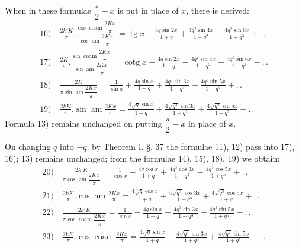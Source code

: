 \documentclass{article}
\begin{document}
When in these formulae $\dfrac{\pi}{2}-x$ is put in place of $x$, there is derived:
\[
\begin{gathered}
\text{16)}\quad\frac{2k'K}{\pi}.\frac{\cos\operatorname{coam}\dfrac{2Kx}{\pi}}{\cos\operatorname{am}\dfrac{2Kx}{\pi}}=\operatorname{tg}x-\frac{4q\sin2x}{1+q}+\frac{4q^{2}\sin4x}{1+q^{2}}-\frac{4q^{3}\sin6x}{1+q^{3}}+.\,.\\[2ex]
\text{17)}\quad\frac{2K}{\pi}.\frac{\sin\operatorname{coam}\dfrac{2Kx}{\pi}}{\sin\operatorname{am}\dfrac{2Kx}{\pi}}=\operatorname{cotg}x+\frac{4q\sin2x}{1-q}-\frac{4q^{2}\sin4x}{1+q^{2}}+\frac{4q^{3}\sin6x}{1-q^{3}}-.\,.\\[2ex]
\text{18)}\quad\frac{2K}{\pi\sin\operatorname{am}\dfrac{2Kx}{\pi}}=\frac{1}{\sin x}+\frac{4q\sin x}{1-q}+\frac{4q^{3}\sin3x}{1-q^{3}}+\frac{4q^{5}\sin5x}{1-q^{5}}+.\,.\\[2ex]
\text{19)}\quad\frac{2kK}{\pi}.\sin\operatorname{am}\frac{2Kx}{\pi}=\frac{4\sqrt{q}\sin x}{1-q}+\frac{4\sqrt{q^{3}}\sin3x}{1-q^{3}}+\frac{4\sqrt{q^{5}}\sin5x}{1-q^{5}}+.\,.
\end{gathered}
\]
Formula 13) remains unchanged on putting $\dfrac{\pi}{2}-x$ in place of $x$.

On changing $q$ into $-q$, by Theorem I. §. 37 the formulae 11), 12) pass into 17), 16); 13) remains unchanged; from the formulae 14), 15), 18), 19) we obtain:
\[
\begin{gathered}
\text{20)}\quad\frac{2k'K}{\pi\cos\operatorname{am}\dfrac{2Kx}{\pi}}=\frac{1}{\cos x}-\frac{4q\cos x}{1+q}+\frac{4q^{3}\cos3x}{1-q^{3}}-\frac{4q^{5}\cos5x}{1+q^{5}}+.\,.\\[2ex]
\text{21)}\quad\frac{2kK}{\pi}.\cos\operatorname{am}\frac{2Kx}{\pi}=\frac{4\sqrt{q}\cos x}{1+q}+\frac{4\sqrt{q^{3}}\cos3x}{1+q^{3}}+\frac{4\sqrt{q^{5}}\cos5x}{1+q^{5}}+.\,.\\[2ex]
\text{22)}\quad\frac{2k'K}{\pi\cos\operatorname{coam}\dfrac{2Kx}{\pi}}=\frac{1}{\sin x}-\frac{4q\sin x}{1+q}-\frac{4q^{3}\sin3x}{1+q^{3}}-\frac{4q^{5}\sin5x}{1+q^{5}}-.\,.\\[2ex]
\text{23)}\quad\frac{2kK}{\pi}.\cos\operatorname{coam}\frac{2Kx}{\pi}=\frac{4\sqrt{q}\sin x}{1+q}-\frac{4\sqrt{q^{3}}\sin3x}{1+q^{3}}+\frac{4\sqrt{q^{5}}\sin5x}{1+q^{5}}-.\,.
\end{gathered}
\]

\end{document}
